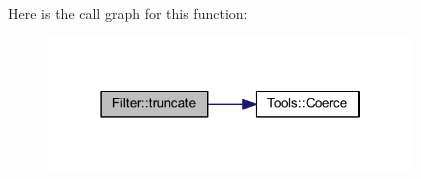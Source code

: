 \-Here is the call graph for this function\-:\nopagebreak
\begin{figure}[H]
\begin{center}
\leavevmode
\includegraphics[width=274pt]{namespace_filter_a1820f44adabb671ddadacbd5e6314f31_cgraph}
\end{center}
\end{figure}


